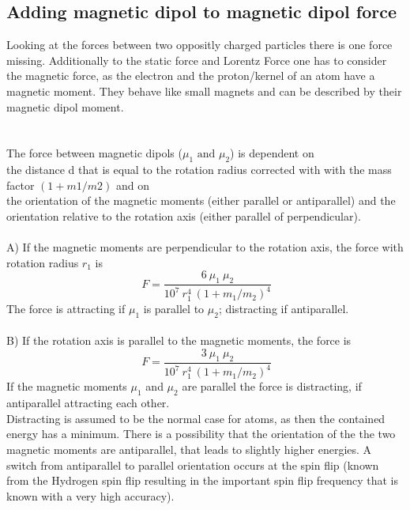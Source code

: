 \documentclass[10pt,titlepage]{article}
\begin{document}
\subsection{Adding magnetic dipol to magnetic dipol force}
Looking at the forces between two oppositly charged particles there is one force missing. Additionally to the static force and Lorentz Force one has to consider the magnetic force, as the electron and the proton/kernel of an atom have a magnetic moment. They behave like small magnets and can be described by their magnetic dipol moment.\\ 
\\\\
The force between magnetic dipols ($\mu_1 \text{ and } \mu_2$) is dependent on \\the distance d that is equal to the rotation radius corrected with with the mass factor $(1+m1/m2)$ and on \\ the orientation of the magnetic moments (either parallel or antiparallel) and the orientation relative to the rotation axis (either parallel of perpendicular).
\\\\
A) If the magnetic moments are perpendicular to the rotation axis, the force with rotation radius $r_1$ is
\begin{equation}
\ F=\frac{6 \ \mu_1 \ \mu_2}{10^7 \ r_1^4 \ (1+m_1/m_2)^4  }
\end{equation}
The force is attracting if $\mu_1$ is parallel to $\mu_2$; distracting if antiparallel.
\\\\
B) If the rotation axis is parallel to the magnetic moments, the force is
\begin{equation}
\ F=\frac{3 \ \mu_1 \ \mu_2}{10^7 \ r_1^4 \ (1+m_1/m_2)^4  }
\end{equation}
If the magnetic moments $\mu_1$ and $\mu_2$ are parallel the force is distracting, if antiparallel attracting each other.
\\ Distracting is assumed to be the normal case for atoms, as then the contained energy has a minimum. There is a possibility that the orientation of the the two magnetic moments are antiparallel, that leads to slightly higher energies. A switch from antiparallel to parallel orientation occurs at the spin flip (known from the Hydrogen spin flip resulting in the important spin flip frequency that is known with a very high accuracy).
\\\\
\end{document}
